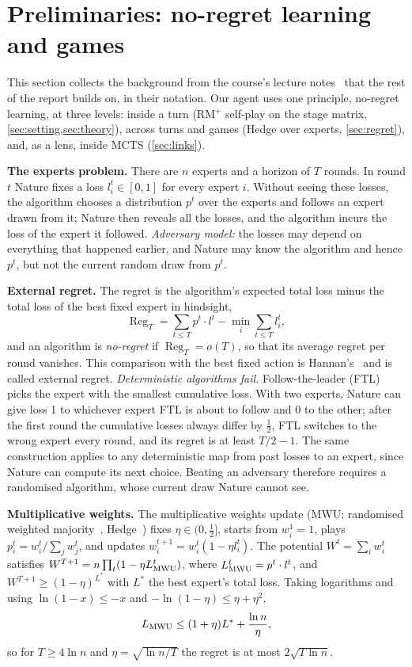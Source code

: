 \documentclass[10pt]{article}
\theoremstyle{plain}
\theoremstyle{definition}
\theoremstyle{remark}
\DeclareMathOperator{\Reg}{Reg}
\begin{document}
\section{Preliminaries: no-regret learning and games}
\label{sec:prelim}
This section collects the background from the course's lecture notes~\cite{CS535L6} that the rest of the report builds on, in their notation. Our agent uses one principle, no-regret learning, at three levels: inside a turn (RM$^+$ self-play on the stage matrix, \cref{sec:setting,sec:theory}), across turns and games (Hedge over experts, \cref{sec:regret}), and, as a lens, inside MCTS (\cref{sec:links}).

\textbf{The experts problem.} There are $n$ experts and a horizon of $T$ rounds. In round $t$ Nature fixes a loss $l^t_i\in[0,1]$ for every expert $i$. Without seeing these losses, the algorithm chooses a distribution $p^t$ over the experts and follows an expert drawn from it; Nature then reveals all the losses, and the algorithm incurs the loss of the expert it followed. \emph{Adversary model:} the losses may depend on everything that happened earlier, and Nature may know the algorithm and hence $p^t$, but not the current random draw from $p^t$.

\textbf{External regret.} The regret is the algorithm's expected total loss minus the total loss of the best fixed expert in hindsight,
\[
\Reg_T=\sum_{t\le T}p^t\cdot l^t-\min_i\sum_{t\le T}l^t_i ,
\]
and an algorithm is \emph{no-regret} if $\Reg_T=o(T)$, so that its average regret per round vanishes. This comparison with the best fixed action is Hannan's~\cite{Hannan57} and is called external regret. \emph{Deterministic algorithms fail.} Follow-the-leader (FTL) picks the expert with the smallest cumulative loss. With two experts, Nature can give loss 1 to whichever expert FTL is about to follow and 0 to the other; after the first round the cumulative losses always differ by $\frac12$, FTL switches to the wrong expert every round, and its regret is at least $T/2-1$. The same construction applies to any deterministic map from past losses to an expert, since Nature can compute its next choice. Beating an adversary therefore requires a randomised algorithm, whose current draw Nature cannot see.

\textbf{Multiplicative weights.} The multiplicative weights update (MWU; randomised weighted majority~\cite{LW94}, Hedge~\cite{FS97}) fixes $\eta\in(0,\frac12]$, starts from $w^1_i=1$, plays $p^t_i=w^t_i/\sum_jw^t_j$, and updates $w^{t+1}_i=w^t_i(1-\eta l^t_i)$. The potential $W^t=\sum_iw^t_i$ satisfies $W^{T+1}=n\prod_t(1-\eta L^t_{\rm MWU})$, where $L^t_{\rm MWU}=p^t\cdot l^t$, and $W^{T+1}\ge(1-\eta)^{L^*}$ with $L^*$ the best expert's total loss. Taking logarithms and using $\ln(1-x)\le-x$ and $-\ln(1-\eta)\le\eta+\eta^2$,
\[
L_{\rm MWU}\le(1+\eta)L^*+\frac{\ln n}{\eta},
\]
so for $T\ge4\ln n$ and $\eta=\sqrt{\ln n/T}$ the regret is at most $2\sqrt{T\ln n}$.
\end{document}
